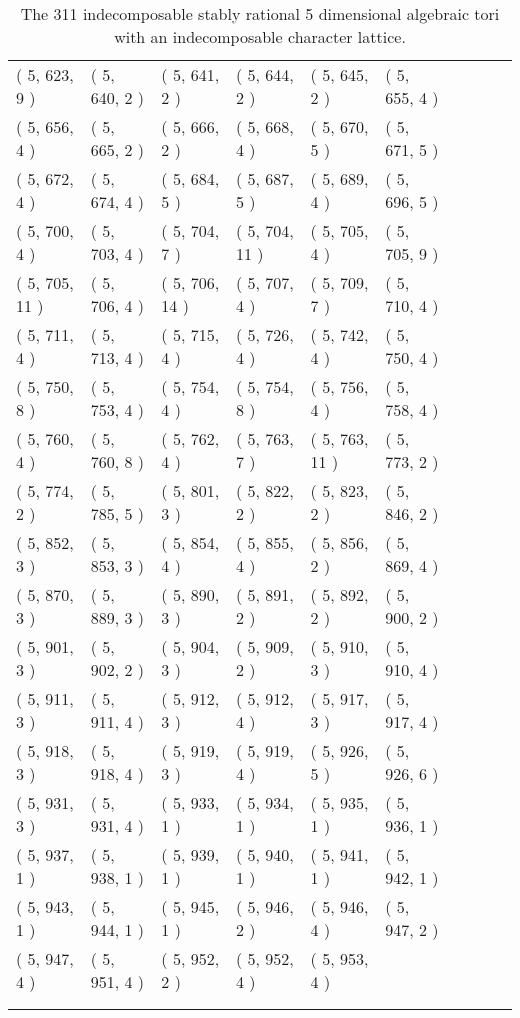 \begin{longtable}{llllllllll}
         ( 5, 623, 9 ) & ( 5, 640, 2 ) & ( 5, 641, 2 ) & ( 5, 644, 2 ) & ( 5, 645, 2 )&  ( 5, 655, 4 ) \\
          ( 5, 656, 4 )&  ( 5, 665, 2 ) & ( 5, 666, 2 ) & ( 5, 668, 4 ) & ( 5, 670, 5 ) & ( 5, 671, 5 ) \\
        ( 5, 672, 4 ) & ( 5, 674, 4 ) & ( 5, 684, 5 ) & ( 5, 687, 5 )&  ( 5, 689, 4 )&  ( 5, 696, 5 ) \\
         ( 5, 700, 4 ) & ( 5, 703, 4 ) & ( 5, 704, 7 ) & ( 5, 704, 11 ) & ( 5, 705, 4 ) & ( 5, 705, 9 ) \\
          ( 5, 705, 11 ) & ( 5, 706, 4 )&  ( 5, 706, 14 ) & ( 5, 707, 4 ) & ( 5, 709, 7 ) & ( 5, 710, 4 ) \\
           ( 5, 711, 4 ) & ( 5, 713, 4 ) & ( 5, 715, 4 ) & ( 5, 726, 4 ) & ( 5, 742, 4 ) &  ( 5, 750, 4 )\\
           ( 5, 750, 8 ) & ( 5, 753, 4 ) & ( 5, 754, 4 ) & ( 5, 754, 8 ) & ( 5, 756, 4 ) &  ( 5, 758, 4 ) \\
            ( 5, 760, 4 ) & ( 5, 760, 8 ) & ( 5, 762, 4 ) &  ( 5, 763, 7 )&  ( 5, 763, 11 ) & ( 5, 773, 2 ) \\
          ( 5, 774, 2 ) & ( 5, 785, 5 ) & ( 5, 801, 3 ) & ( 5, 822, 2 ) & ( 5, 823, 2 ) & ( 5, 846, 2 ) \\
           ( 5, 852, 3 ) & ( 5, 853, 3 )&  ( 5, 854, 4 ) & ( 5, 855, 4 ) & ( 5, 856, 2 ) & ( 5, 869, 4 ) \\
           ( 5, 870, 3 ) & ( 5, 889, 3 ) & ( 5, 890, 3 ) & ( 5, 891, 2 ) & ( 5, 892, 2 ) & ( 5, 900, 2 )\\
            ( 5, 901, 3 ) & ( 5, 902, 2 ) & ( 5, 904, 3 ) &( 5, 909, 2 ) & ( 5, 910, 3 ) & ( 5, 910, 4 ) \\
             ( 5, 911, 3 ) & ( 5, 911, 4 ) & ( 5, 912, 3 ) & ( 5, 912, 4 )& ( 5, 917, 3 ) & ( 5, 917, 4 ) \\
              ( 5, 918, 3 ) & ( 5, 918, 4 ) & ( 5, 919, 3 ) & ( 5, 919, 4 ) & ( 5, 926, 5 ) & ( 5, 926, 6 ) \\
               ( 5, 931, 3 ) &  ( 5, 931, 4 )&  ( 5, 933, 1 ) & ( 5, 934, 1 ) & ( 5, 935, 1 ) & ( 5, 936, 1 ) \\
           ( 5, 937, 1 ) & ( 5, 938, 1 ) & ( 5, 939, 1 ) & ( 5, 940, 1 ) & ( 5, 941, 1 ) &  ( 5, 942, 1 )\\
             ( 5, 943, 1 ) & ( 5, 944, 1 ) & ( 5, 945, 1 ) & ( 5, 946, 2 ) & ( 5, 946, 4 ) & ( 5, 947, 2 ) \\
              ( 5, 947, 4 ) & ( 5, 951, 4 ) &  ( 5, 952, 2 ) & ( 5, 952, 4 )&  ( 5, 953, 4 ) & \\
              \\
 \caption{The 311 indecomposable stably rational 5 dimensional algebraic tori with an indecomposable character lattice.}
\end{longtable}


